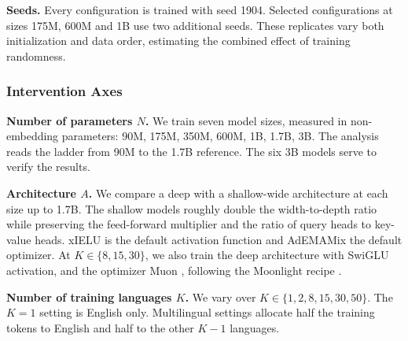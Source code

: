\textbf{Seeds.} Every configuration is trained with seed 1904. Selected configurations at sizes 175M, 600M and 1B use two additional seeds.
These replicates vary both initialization and data order, estimating the combined effect of training randomness.


\subsubsection{Intervention Axes}

\textbf{Number of parameters $N$.} We train seven model sizes, measured in non-embedding parameters: 90M, 175M, 350M, 600M, 1B, 1.7B, 3B.
The analysis reads the ladder from 90M to the 1.7B reference. The six 3B models serve to verify the results.

\textbf{Architecture $A$.} We compare a deep with a shallow-wide architecture at each size up to 1.7B. The shallow models roughly double the width-to-depth ratio while preserving the feed-forward multiplier and the ratio of query heads to key-value heads. %
xIELU is the default activation function \citep{huang_xielu_2025} and AdEMAMix the default optimizer.
At $K \in \{8, 15, 30\}$, we also train the deep architecture with SwiGLU activation, %
and the optimizer Muon \citep{jordan_muon_2024}, following the Moonlight recipe \citep{liu_muon_2025}. %

\textbf{Number of training languages $K$.} We vary over $K \in \{1, 2, 8, 15, 30, 50\}$. The $K=1$ setting is English only. Multilingual settings allocate half the training tokens to English and half to the other $K-1$ languages.

